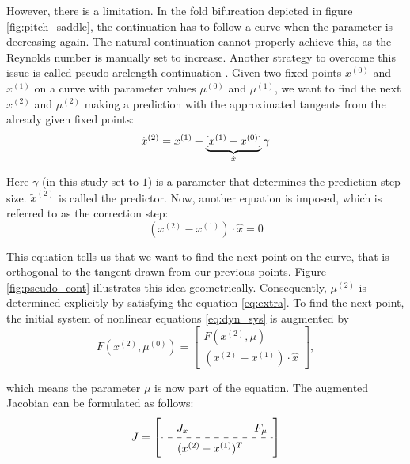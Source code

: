 However, there is a limitation. In the fold bifurcation depicted in figure
\ref{fig:pitch_saddle}, the continuation has to follow a curve when the
parameter is decreasing again. The natural continuation cannot properly achieve
this, as the Reynolds number is manually set to increase. Another strategy to
overcome this issue is called pseudo-arclength continuation
\citep{kuznetsov2004}. Given two fixed points $x^{(0)}$ and $x^{(1)}$ on a
curve with parameter values $\mu^{(0)}$ and $\mu^{(1)}$, we want to find the
next $x^{(2)}$ and $\mu^{(2)}$ making a prediction with the approximated
tangents from the already given fixed points:
\begin{equation}
  \tilde{x}^{(2)} = x^{(1)}  + \underbrace{[x^{(1)} - x^{(0)}]}_{\text{\normalfont $\hat{x}$}} \gamma
\end{equation}

Here $\gamma$ (in this study set to $1$) is a parameter that determines the
prediction step size. $\tilde{x}^{(2)}$ is called the predictor. Now, another
equation is imposed, which is referred to as the correction step:
\begin{equation}
  (x^{(2)} - x^{(1)})  \cdot \hat{x} = 0 \label{eq:extra}
\end{equation}

This equation tells us that we want to find the next point on the curve, that
is orthogonal to the tangent drawn from our previous points. Figure
\ref{fig:pseudo_cont} illustrates this idea geometrically. Consequently,
$\mu^{(2)}$ is determined explicitly by satisfying the equation
\eqref{eq:extra}. To find the next point, the initial system of nonlinear
equations \eqref{eq:dyn_sys} is augmented by
\begin{equation}
  F(x^{(2)}, \mu^{(0)}) = 
\begin{bmatrix} F(x^{(2)}, \mu) \\ (x^{(2)} - x^{(1)})  \cdot \hat{x}
\end{bmatrix}, \label{eq:dyn_sys_cont}
\end{equation}

which means the parameter $\mu$ is now part of the equation. The augmented
Jacobian can be formulated as follows: 
\begin{equation}
\renewcommand\arraystretch{1.5}
J = 
\left[
\begin{array}{cc}
  J_x \quad \quad \quad \quad & F_{\mu} \\
  \hdashline
  \quad (x^{(2)} - x^{(1)})^T
\end{array} \label{eq:jac_aug}
\right]
\end{equation}

